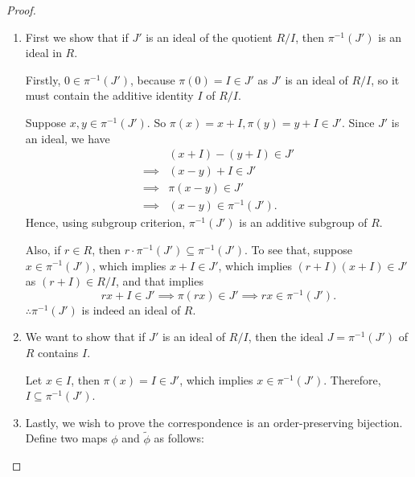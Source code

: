\begin{proof}
    \begin{enumerate}[label= Step (\arabic*)., leftmargin=*]
        \item First we show that if \(J'\) is an ideal of the quotient \(R/I\), then \(\pi^{-1}(J')\) is an ideal in \(R\). 

        Firstly, \(0 \in \pi^{-1}(J')\), because \(\pi(0) = I \in J'\) as \(J'\) is an ideal of \(R/I\), so it must contain the additive identity \(I\) of \(R/I\).

        Suppose \(x, y \in \pi^{-1}(J')\). So \(\pi(x) = x + I, \pi(y) = y+I \in J'\). Since \(J'\) is an ideal, we have 
        \begin{align*}
            &(x+I) - (y+I) \in J'\\
            \implies &(x - y) + I \in J'\\
            \implies &\pi(x-y) \in J'\\
            \implies &(x-y) \in \pi^{-1}(J').
        \end{align*}
        Hence, using subgroup criterion, \(\pi^{-1}(J')\) is an additive subgroup of \(R\). 

    Also, if \(r \in R\), then \(r \cdot \pi^{-1}(J') \subseteq \pi^{-1}(J')\). To see that, suppose \(x \in \pi^{-1}(J')\), which implies \(x+I \in J'\), which implies \((r+I)(x+I) \in J'\) as \((r +I) \in R/I\), and that implies \[rx +I \in J' \implies \pi(rx) \in J' \implies rx \in \pi^{-1}(J').\]
    \(\therefore \pi^{-1}(J')\) is indeed an ideal of \(R\).
\item We want to show that if \(J'\) is an ideal of \(R/I\), then the ideal \(J = \pi^{-1}(J')\) of \(R\) contains \(I\). 

    Let \(x \in I\), then \(\pi(x) = I \in J'\), which implies \(x \in \pi^{-1}(J')\). Therefore, \(I \subseteq \pi^{-1}(J')\).

\item Lastly, we wish to prove the correspondence is an order-preserving bijection. Define two maps \(\phi\) and \(\tilde{\phi}\) as follows: 

    

\begin{tikzpicture}[x=0.75pt,y=0.75pt,yscale=-1,xscale=1]


\end{tikzpicture}
\end{enumerate}
\end{proof}
